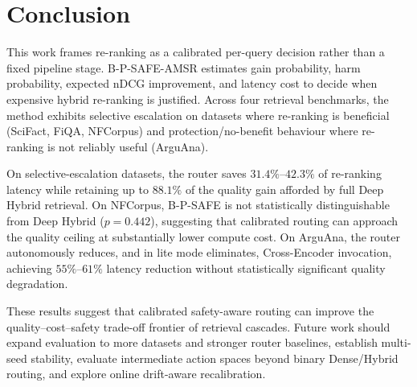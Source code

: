 \documentclass[journal]{IEEEtran}
\begin{document}
\section{Conclusion}
\label{sec:conclusion}

This work frames re-ranking as a calibrated per-query decision
rather than a fixed pipeline stage. B-P-SAFE-AMSR estimates gain
probability, harm probability, expected nDCG improvement, and
latency cost to decide when expensive hybrid re-ranking is
justified. Across four retrieval benchmarks, the method exhibits
selective escalation on datasets where re-ranking is beneficial
(SciFact, FiQA, NFCorpus) and protection/no-benefit behaviour
where re-ranking is not reliably useful (ArguAna).

On selective-escalation datasets, the router saves
$31.4\%$--$42.3\%$ of re-ranking latency while retaining up to
$88.1\%$ of the quality gain afforded by full Deep Hybrid
retrieval. On NFCorpus, B-P-SAFE is not statistically
distinguishable from Deep Hybrid ($p = 0.442$), suggesting that
calibrated routing can approach the quality ceiling at
substantially lower compute cost. On ArguAna, the router
autonomously reduces, and in lite mode eliminates, Cross-Encoder
invocation, achieving $55\%$--$61\%$ latency reduction without
statistically significant quality degradation.

These results suggest that calibrated safety-aware routing can
improve the quality--cost--safety trade-off frontier of retrieval
cascades. Future work should expand evaluation to more datasets
and stronger router baselines, establish multi-seed stability,
evaluate intermediate action spaces beyond binary Dense/Hybrid
routing, and explore online drift-aware recalibration.
\end{document}
